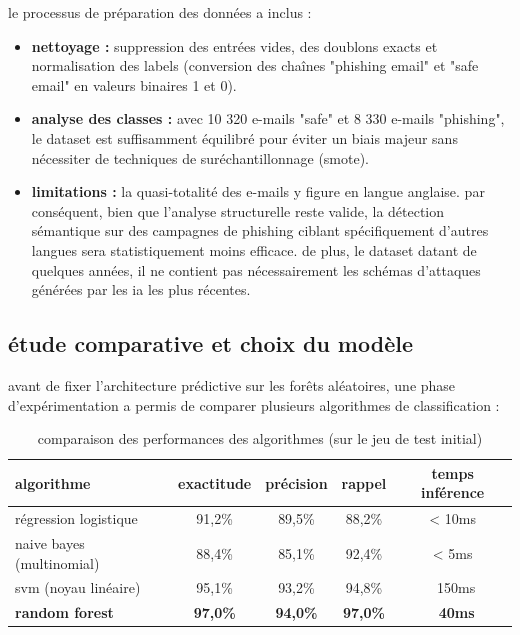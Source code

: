 \documentclass[12pt,a4paper]{report}
\begin{document}
le processus de préparation des données a inclus :
\begin{itemize}
    \item \textbf{nettoyage :} suppression des entrées vides, des doublons exacts et normalisation des labels (conversion des chaînes "phishing email" et "safe email" en valeurs binaires 1 et 0).
    \item \textbf{analyse des classes :} avec 10 320 e-mails "safe" et 8 330 e-mails "phishing", le dataset est suffisamment équilibré pour éviter un biais majeur sans nécessiter de techniques de suréchantillonnage (smote).
    \item \textbf{limitations :} la quasi-totalité des e-mails y figure en langue anglaise. par conséquent, bien que l'analyse structurelle reste valide, la détection sémantique sur des campagnes de phishing ciblant spécifiquement d'autres langues sera statistiquement moins efficace. de plus, le dataset datant de quelques années, il ne contient pas nécessairement les schémas d'attaques générées par les ia les plus récentes.
\end{itemize}

\subsection{étude comparative et choix du modèle}
avant de fixer l'architecture prédictive sur les forêts aléatoires, une phase d'expérimentation a permis de comparer plusieurs algorithmes de classification :

\begin{table}[h]
\centering
\caption{comparaison des performances des algorithmes (sur le jeu de test initial)}
\begin{tabular}{lcccc}
\toprule
\textbf{algorithme} & \textbf{exactitude} & \textbf{précision} & \textbf{rappel} & \textbf{temps inférence} \\
\midrule
régression logistique & 91,2\% & 89,5\% & 88,2\% & < 10ms \\
naive bayes (multinomial) & 88,4\% & 85,1\% & 92,4\% & < 5ms \\
svm (noyau linéaire) & 95,1\% & 93,2\% & 94,8\% & ~150ms \\
\textbf{random forest} & \textbf{97,0\%} & \textbf{94,0\%} & \textbf{97,0\%} & \textbf{~40ms} \\
\bottomrule
\end{tabular}
\end{table}
\end{document}
